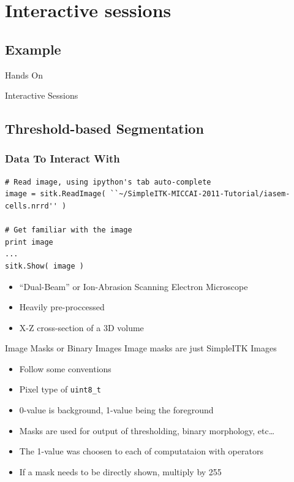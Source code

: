 \section{Interactive sessions}

%
%

\subsection{Example}
\begin{frame}{Hands On}
\fontsize{36pt}{36pt}\selectfont
\center
\begin{center}
Interactive Sessions
\end{center}
\end{frame}

\subsection{Threshold-based Segmentation}

\begin{frame}[fragile]
\frametitle{Data To Interact With}
\lstpython
\begin{lstlisting}
# Read image, using ipython's tab auto-complete
image = sitk.ReadImage( ``~/SimpleITK-MICCAI-2011-Tutorial/iasem-cells.nrrd'' )

# Get familiar with the image
print image
...
sitk.Show( image )
\end{lstlisting}
\begin{itemize}
  \item ``Dual-Beam'' or Ion-Abrasion Scanning Electron Microscope
  \item Heavily pre-proccessed
  \item  X-Z cross-section of a 3D volume
\end{itemize}
\end{frame}

\begin{frame}{Image Masks or Binary Images}
Image masks are just SimpleITK Images
\begin{itemize}
  \item Follow some conventions
  \item Pixel type of \texttt{uint8\_t}
  \item 0-value is background, 1-value being the foreground
  \item Masks are used for output of thresholding, binary morphology, etc\dots
  \item The 1-value was choosen to each of computataion with operators
  \item If a mask needs to be directly shown, multiply by 255
\end{itemize}
\end{frame}



